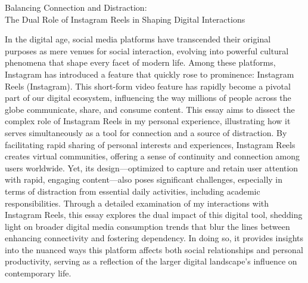 \documentclass[12pt]{article}
\begin{document}
\thispagestyle{fancy}

\doublespacing

\begin{center}
    Balancing Connection and Distraction: \\
    The Dual Role of Instagram Reels in Shaping Digital Interactions
\end{center}


In the digital age, social media platforms have transcended their original purposes as mere venues for social interaction, evolving into powerful cultural phenomena that shape every facet of modern life. Among these platforms, Instagram has introduced a feature that quickly rose to prominence: Instagram Reels (Instagram). This short-form video feature has rapidly become a pivotal part of our digital ecosystem, influencing the way millions of people across the globe communicate, share, and consume content. This essay aims to dissect the complex role of Instagram Reels in my personal experience, illustrating how it serves simultaneously as a tool for connection and a source of distraction. By facilitating rapid sharing of personal interests and experiences, Instagram Reels creates virtual communities, offering a sense of continuity and connection among users worldwide. Yet, its design—optimized to capture and retain user attention with rapid, engaging content—also poses significant challenges, especially in terms of distraction from essential daily activities, including academic responsibilities. Through a detailed examination of my interactions with Instagram Reels, this essay explores the dual impact of this digital tool, shedding light on broader digital media consumption trends that blur the lines between enhancing connectivity and fostering dependency. In doing so, it provides insights into the nuanced ways this platform affects both social relationships and personal productivity, serving as a reflection of the larger digital landscape's influence on contemporary life.
\end{document}
